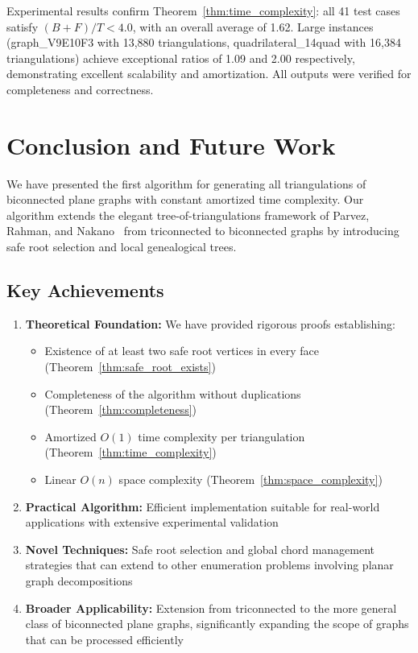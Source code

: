 \documentclass[12pt,a4paper]{article}
\theoremstyle{definition}
\theoremstyle{remark}
\begin{document}
Experimental results confirm Theorem~\ref{thm:time_complexity}: all 41 test cases satisfy $(B+F)/T < 4.0$, with an overall average of 1.62. Large instances (graph\_V9E10F3 with 13,880 triangulations, quadrilateral\_14quad with 16,384 triangulations) achieve exceptional ratios of 1.09 and 2.00 respectively, demonstrating excellent scalability and amortization. All outputs were verified for completeness and correctness.

\section{Conclusion and Future Work}
\label{sec:conclusion}

We have presented the first algorithm for generating all triangulations of biconnected plane graphs with constant amortized time complexity. Our algorithm extends the elegant tree-of-triangulations framework of Parvez, Rahman, and Nakano~\cite{parvez2011} from triconnected to biconnected graphs by introducing safe root selection and local genealogical trees.

\subsection{Key Achievements}

\begin{enumerate}
\item \textbf{Theoretical Foundation:} We have provided rigorous proofs establishing:
    \begin{itemize}
        \item Existence of at least two safe root vertices in every face (Theorem~\ref{thm:safe_root_exists})
        \item Completeness of the algorithm without duplications (Theorem~\ref{thm:completeness})
        \item Amortized $O(1)$ time complexity per triangulation (Theorem~\ref{thm:time_complexity})
        \item Linear $O(n)$ space complexity (Theorem~\ref{thm:space_complexity})
    \end{itemize}

\item \textbf{Practical Algorithm:} Efficient implementation suitable for real-world applications with extensive experimental validation

\item \textbf{Novel Techniques:} Safe root selection and global chord management strategies that can extend to other enumeration problems involving planar graph decompositions

\item \textbf{Broader Applicability:} Extension from triconnected to the more general class of biconnected plane graphs, significantly expanding the scope of graphs that can be processed efficiently
\end{enumerate}
\end{document}
